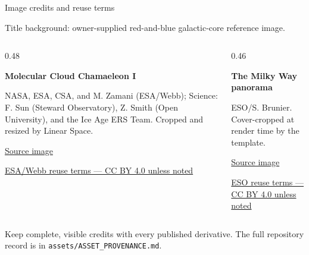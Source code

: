 \documentclass[aspectratio=169,professionalfonts]{beamer}
\begin{document}
\begin{frame}[t]{Image credits and reuse terms}
  {\fontsize{12.5}{15.5}\selectfont\color{LSDeckMint}
  Title background: owner-supplied red-and-blue galactic-core reference image.\par}
  \vspace{0.14in}
  \begin{columns}[T,onlytextwidth]
    \begin{column}{0.48\textwidth}
      {\fontsize{17}{20}\selectfont\bfseries\color{LSDeckLime}
      Molecular Cloud Chamaeleon I\par}
      \vspace{0.10in}
      {\fontsize{12.5}{15.5}\selectfont\RaggedRight
      NASA, ESA, CSA, and M. Zamani (ESA/Webb); Science: F. Sun (Steward
      Observatory), Z. Smith (Open University), and the Ice Age ERS Team.
      Cropped and resized by Linear Space.\par
      \vspace{0.10in}
      \href{https://esawebb.org/images/weic2303a/}{Source image}\par
      \href{https://esawebb.org/copyright/}{ESA/Webb reuse terms --- CC BY 4.0 unless noted}\par}
    \end{column}
    \begin{column}{0.46\textwidth}
      {\fontsize{17}{20}\selectfont\bfseries\color{LSDeckGreen}
      The Milky Way panorama\par}
      \vspace{0.10in}
      {\fontsize{12.5}{15.5}\selectfont\RaggedRight
      ESO/S. Brunier. Cover-cropped at render time by the template.\par
      \vspace{0.10in}
      \href{https://www.eso.org/public/images/eso0932a/}{Source image}\par
      \href{https://www.eso.org/public/outreach/copyright/}{ESO reuse terms --- CC BY 4.0 unless noted}\par}
    \end{column}
  \end{columns}
  \vfill
  {\fontsize{12.5}{15.5}\selectfont\color{LSDeckMint}
  Keep complete, visible credits with every published derivative. The full
  repository record is in \texttt{assets/ASSET\_PROVENANCE.md}.\par}
\end{frame}
\end{document}
